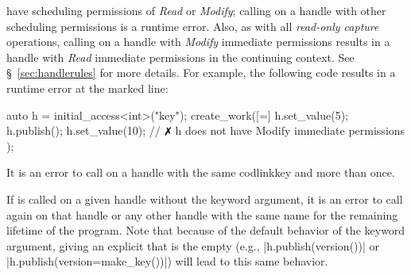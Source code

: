 \begin{compactitem}
  have \gls{scheduling permissions} of {\it Read} or {\it Modify}; calling
   on a \gls{handle} with other \gls{scheduling permissions} is a runtime error.  Also, as with
  all {\it read-only capture} operations, calling  on a
  \gls{handle} with {\it Modify} \gls{immediate permissions} results in a
  \gls{handle} with {\it Read} \gls{immediate permissions} in the
  \gls{continuing context}.  See
  \S~\ref{sec:handlerules} for more details.  For example, the following code
  results in a runtime error at the marked line:
  \begin{CppCode}
  auto h = initial_access<int>("key");
  create_work([=]{
    h.set_value(5);
    h.publish();
    h.set_value(10); // $\no$ h does not have Modify immediate permissions
  });
  \end{CppCode}
\item It is an error to call  on a \gls{handle} with the same 
  codlink{key} and  more than once.
\item If  is called on a given \gls{handle} without the
   \gls{keyword argument}, it is an error to call 
  again on that \gls{handle} or any other \gls{handle} with the same name
   for the
  remaining lifetime of the program.  Note that because of the default behavior
  of the  \gls{keyword argument}, giving an explicit
   that is
  the empty  (e.g., |h.publish(version())| or
  |h.publish(version=make_key())|) will lead to this same behavior.
\end{compactitem}



